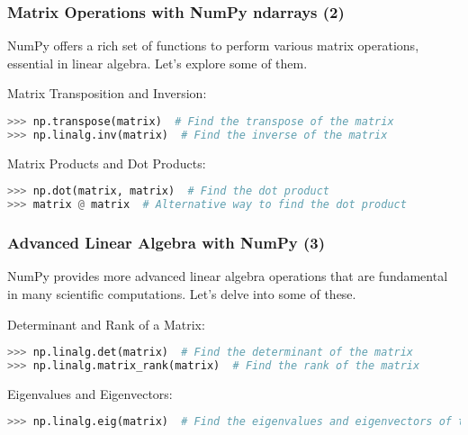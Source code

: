 \begin{frame}[fragile]
  \frametitle{Matrix Operations with NumPy ndarrays (2)}
  NumPy offers a rich set of functions to perform various matrix operations, essential in linear algebra. Let's explore some of them.\pause

  Matrix Transposition and Inversion:
  \begin{lstlisting}[language=Python, numbers=none]
>>> np.transpose(matrix)  # Find the transpose of the matrix
>>> np.linalg.inv(matrix)  # Find the inverse of the matrix
  \end{lstlisting}\pause

  Matrix Products and Dot Products:
  \begin{lstlisting}[language=Python, numbers=none]
>>> np.dot(matrix, matrix)  # Find the dot product
>>> matrix @ matrix  # Alternative way to find the dot product
  \end{lstlisting}
\end{frame}

\begin{frame}[fragile]
  \frametitle{Advanced Linear Algebra with NumPy (3)}
  NumPy provides more advanced linear algebra operations that are fundamental in many scientific computations. Let's delve into some of these.\pause
  
  Determinant and Rank of a Matrix:
  \begin{lstlisting}[language=Python, numbers=none]
>>> np.linalg.det(matrix)  # Find the determinant of the matrix
>>> np.linalg.matrix_rank(matrix)  # Find the rank of the matrix
  \end{lstlisting}\pause
  
  Eigenvalues and Eigenvectors:
  \begin{lstlisting}[language=Python, numbers=none]
>>> np.linalg.eig(matrix)  # Find the eigenvalues and eigenvectors of the matrix
  \end{lstlisting}
\end{frame}


